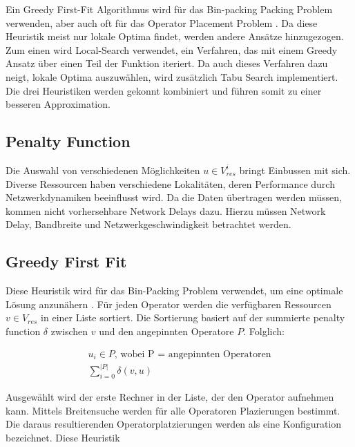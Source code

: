 \documentclass{article}
\begin{document}
Ein Greedy First-Fit Algorithmus wird für das Bin-packing Packing Problem verwenden, 
aber auch oft für das Operator Placement Problem \cite{k7}\cite{k8}.
Da diese Heuristik meist nur lokale Optima findet, werden andere Ansätze hinzugezogen. 
Zum einen wird Local-Search verwendet, ein Verfahren, 
das mit einem Greedy Ansatz über einen Teil der Funktion iteriert. Da auch dieses
Verfahren dazu neigt, lokale Optima auszuwählen, wird zusätzlich Tabu Search implementiert. 
Die drei Heuristiken werden gekonnt kombiniert und führen somit zu einer besseren Approximation. 

\subsection{Penalty Function} 
Die Auswahl von verschiedenen Möglichkeiten $u \in V_{res}^i$ bringt Einbussen mit sich. Diverse Ressourcen haben verschiedene Lokalitäten,
deren Performance durch Netzwerkdynamiken beeinflusst wird. Da die Daten übertragen werden müssen, kommen nicht vorhersehbare Network Delays dazu. Hierzu müssen Network Delay, 
Bandbreite und Netzwerkgeschwindigkeit\cite{efficient-operator-placement} betrachtet werden.


\subsection{Greedy First Fit} \label{greedy-first-fit}
Diese Heuristik wird  für das Bin-Packing Problem verwendet, um eine optimale Lösung anzunähern \cite{greedy-first-fit}. 
Für jeden Operator werden die verfügbaren Ressourcen $v \in V_{res}$ in einer Liste sortiert. Die Sortierung basiert auf der summierte penalty function $\delta$
zwischen $v$ und den angepinnten Operatore $P$. Folglich:

\[ 
    \begin{gathered}
        u_i \in P \text{, wobei P = angepinnten Operatoren} \\
        \sum_{i=0}^{|P|} \delta(v, u)
    \end{gathered} 
\] 

Ausgewählt wird der erste Rechner in der Liste, der den Operator aufnehmen kann. 
Mittels Breitensuche werden für alle Operatoren Plazierungen bestimmt. Die daraus resultierenden Operatorplatzierungen werden als eine Konfiguration bezeichnet. 
Diese Heuristik 

\end{document}
